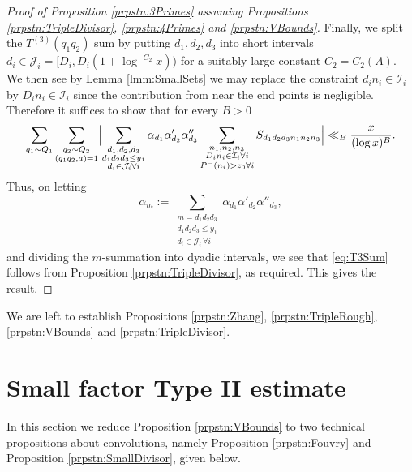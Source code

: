 \documentclass[10pt]{amsart}
\theoremstyle{plain}
\numberwithin{equation}{section}
\begin{document}
\begin{proof}[Proof of Proposition \ref{prpstn:3Primes} assuming Propositions \ref{prpstn:TripleDivisor}, \ref{prpstn:4Primes} and \ref{prpstn:VBounds}]
Finally, we split the $T^{(3)}(q_1q_2)$ sum by putting $d_1,d_2,d_3$ into short intervals $d_i\in\mathcal{J}_i=[D_i,D_i(1+\log^{-C_2}{x}) )$ for a suitably large constant $C_2=C_2(A)$. We then see by Lemma \ref{lmm:SmallSets} we may replace the constraint $d_i n_i\in \mathcal{I}_i$ by $D_i n_i\in\mathcal{I}_i$ since the contribution from near the end points is negligible. Therefore it suffices to show that for every $B>0$
\begin{equation}
\sum_{q_1\sim Q_1}\sum_{\substack{ q_2\sim Q_2\\ (q_1q_2,a)=1}}\Bigl|\sum_{\substack{d_1,d_2,d_3\\ d_1d_2d_3\le y_1\\ d_i\in\mathcal{J}_i\forall i}}\alpha_{d_1}\alpha'_{d_2}\alpha''_{d_3}\sum_{\substack{n_1,n_2,n_3\\ D_i n_i\in \mathcal{I}_i\forall i\\ P^-(n_i)>z_0\forall i}}S_{d_1d_2d_3n_1n_2n_3}\Bigr|\ll_B\frac{x}{(\log{x})^B}.
\label{eq:T3Sum}
\end{equation}
Thus, on letting
\[
\alpha_m:=\sum_{\substack{m=d_1d_2d_3\\ d_1d_2d_3\le y_1\\ d_i\in \mathcal{J}_i\,\forall i}}\alpha_{d_1}\alpha'_{d_2}\alpha''_{d_3},
\]
and dividing the $m$-summation into dyadic intervals, we see that \eqref{eq:T3Sum} follows from Proposition \ref{prpstn:TripleDivisor}, as required. This gives the result.
\end{proof}
%
%
%
%
%
%
%
%
We are left to establish Propositions \ref{prpstn:Zhang}, \ref{prpstn:TripleRough}, \ref{prpstn:VBounds} and \ref{prpstn:TripleDivisor}.
%
%
%
%
%
%
%
%
%
%
%
%
%
%
%
%
%
%
\section{Small factor Type II estimate}\label{sec:SmallTypeII}
%
%
%
%
In this section we reduce Proposition \ref{prpstn:VBounds} to two technical propositions about convolutions, namely Proposition \ref{prpstn:Fouvry} and Proposition \ref{prpstn:SmallDivisor}, given below. 
\end{document}
